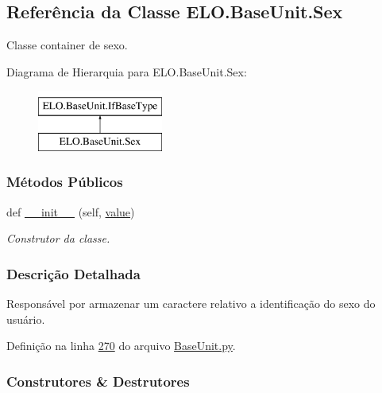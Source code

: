 \hypertarget{classELO_1_1BaseUnit_1_1Sex}{}\subsection{Referência da Classe E\+L\+O.\+Base\+Unit.\+Sex}
\label{classELO_1_1BaseUnit_1_1Sex}


Classe container de sexo.  


Diagrama de Hierarquia para E\+L\+O.\+Base\+Unit.\+Sex\+:\begin{figure}[H]
\begin{center}
\leavevmode
\includegraphics[height=2.000000cm]{dd/d8a/classELO_1_1BaseUnit_1_1Sex}
\end{center}
\end{figure}
\subsubsection*{Métodos Públicos}
\begin{DoxyCompactItemize}
\item 
def \hyperlink{classELO_1_1BaseUnit_1_1Sex_a731f457d4e4ad3073497385ccd05ed80}{\+\_\+\+\_\+init\+\_\+\+\_\+} (self, \hyperlink{classELO_1_1BaseUnit_1_1IfBaseType_a2534c3548a8e5991dde0a64b4f0b542b}{value})
\begin{DoxyCompactList}\small\item\em Construtor da classe. \end{DoxyCompactList}\end{DoxyCompactItemize}


\subsubsection{Descrição Detalhada}
Responsável por armazenar um caractere relativo a identificação do sexo do usuário. 

Definição na linha \hyperlink{BaseUnit_8py_source_l00270}{270} do arquivo \hyperlink{BaseUnit_8py_source}{Base\+Unit.\+py}.



\subsubsection{Construtores \& Destrutores}
\hypertarget{classELO_1_1BaseUnit_1_1Sex_a731f457d4e4ad3073497385ccd05ed80}{}
